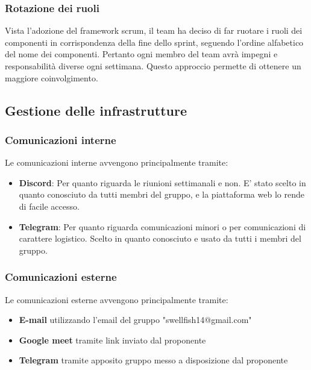 \documentclass[12pt]{article}
\begin{document}
\subsubsection{Rotazione dei ruoli}
Vista l'adozione del framework scrum, il team ha deciso di far ruotare i ruoli dei componenti in corrispondenza della fine dello sprint, seguendo l'ordine alfabetico del nome dei componenti.
Pertanto ogni membro del team avrà impegni e responsabilità diverse ogni settimana. Questo approccio permette di ottenere un maggiore coinvolgimento.

\subsection{Gestione delle infrastrutture}
\subsubsection{Comunicazioni interne}
Le comunicazioni interne avvengono principalmente tramite:
\begin{itemize}
    \item \textbf{Discord}: Per quanto riguarda le riunioni settimanali e non. E' stato scelto in quanto conosciuto da tutti membri del gruppo, e la piattaforma web lo rende di facile accesso.
    \item \textbf{Telegram}: Per quanto riguarda comunicazioni minori o per comunicazioni di carattere logistico. Scelto in quanto conosciuto e usato da tutti i membri del gruppo.
\end{itemize}

\subsubsection{Comunicazioni esterne}
Le comunicazioni esterne avvengono principalmente tramite:
\begin{itemize}
    \item \textbf{E-mail} utilizzando l'email del gruppo "swellfish14@gmail.com"
    \item \textbf{Google meet} tramite link inviato dal proponente
    \item \textbf{Telegram} tramite apposito gruppo messo a disposizione dal proponente
\end{itemize}
\end{document}
